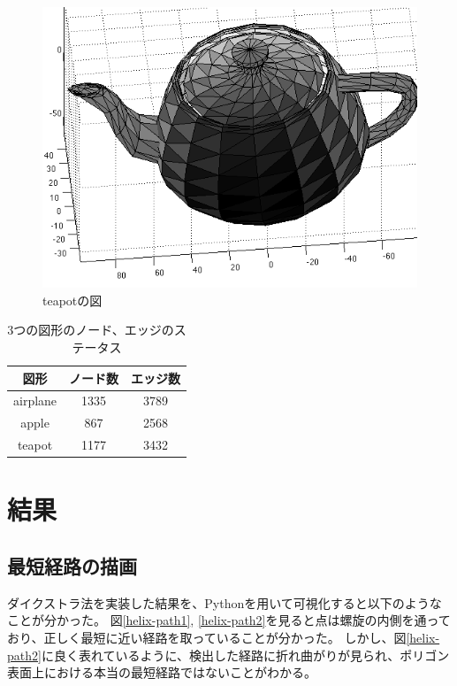 \documentclass[a4paper,11pt]{jsarticle}
\begin{document}
\begin{figure}[H]
  \centering
  \includegraphics[scale = 0.8]{../Figs/teapot.png} 
  \caption{teapotの図}
  \label{teapot}
\end{figure}


\begin{table}[H]
  \centering\begin{tabular}{ccc}
  図形 & ノード数 & エッジ数 \\
  \hline
  airplane & 1335 & 3789 \\
  apple & 867 & 2568 \\
  teapot & 1177 & 3432 \\
  \hline
  \end{tabular}
  \caption{3つの図形のノード、エッジのステータス}
  \label{node-edge}
\end{table}


\section{結果}

\subsection{最短経路の描画}

ダイクストラ法を実装した結果を、Pythonを用いて可視化すると以下のようなことが分かった。
図\ref{helix-path1}, \ref{helix-path2}を見ると点は螺旋の内側を通っており、正しく最短に近い経路を取っていることが分かった。
しかし、図\ref{helix-path2}に良く表れているように、検出した経路に折れ曲がりが見られ、ポリゴン表面上における本当の最短経路ではないことがわかる。
\end{document}
